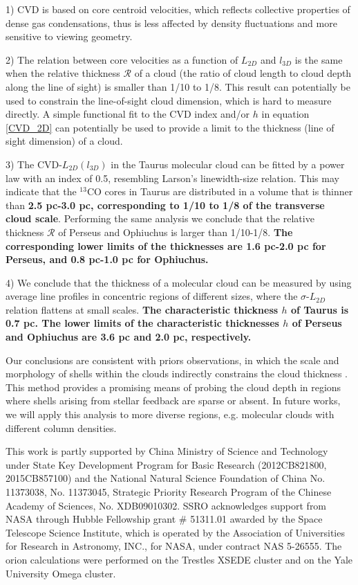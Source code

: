 \documentclass[iop,revtex4]{emulateapj}
\begin{document}
1) CVD is based on core centroid velocities, which reflects collective properties of dense gas condensations, thus is less affected by density fluctuations
\cite[c.f.][]{Brunt2004} and more sensitive to viewing geometry.

2) The relation between core velocities as a function of $L_{2D}$ and $l_{3D}$ is the same when the relative thickness $\mathcal{R}$ of a cloud (the ratio of cloud length to cloud depth along the line of sight) is smaller than 1/10 to 1/8. This result can potentially be used to constrain the line-of-sight cloud dimension, which is hard to measure directly. A simple functional fit to the CVD index and/or $h$ in equation \ref{CVD_2D} can potentially be used to provide a limit to the thickness (line of sight dimension) of a cloud.


3) The CVD-$L_{2D}(l_{3D})$ in the Taurus molecular cloud can be fitted by a power law with an index of 0.5, resembling Larson's linewidth-size relation. This may indicate that the $^{13}$CO cores in Taurus are distributed in a volume that is thinner than {\bf 2.5 pc-3.0 pc, corresponding to 1/10 to 1/8 of the transverse cloud scale}. Performing the same analysis we conclude that the relative thickness $\mathcal{R}$ of Perseus and Ophiuchus is larger than 1/10-1/8.
{\bf The corresponding lower limits of the thicknesses are 1.6 pc-2.0 pc for Perseus, and 0.8 pc-1.0 pc for Ophiuchus.}


4) We conclude that the thickness of a molecular cloud can be measured by using average line profiles in concentric regions of different sizes, where the $\sigma$-$L_{2D}$ relation flattens at small scales. {\bf The characteristic thickness $h$ of Taurus is 0.7 pc. The lower limits of the characteristic thicknesses $h$ of Perseus and Ophiuchus are 3.6 pc and 2.0 pc, respectively.}


Our conclusions are consistent with priors observations, in which the scale and morphology of shells within the clouds indirectly constrains the cloud thickness \citep{Arce2011,Li2015}. This method provides a promising means of probing the cloud depth in regions where shells arising from stellar feedback are sparse or absent. In future works, we will apply this analysis to more diverse regions, e.g. molecular clouds with different column densities.

\acknowledgments This work is partly supported by  China Ministry of
Science and Technology under State Key Development Program for Basic
Research (2012CB821800, 2015CB857100) and the National Natural Science Foundation of China No. 11373038, No. 11373045, Strategic Priority Research Program of the Chinese Academy of Sciences, No. XDB09010302. SSRO acknowledges support from NASA through Hubble Fellowship grant \# 51311.01 awarded by the Space Telescope Science Institute, which is operated by the Association of Universities for Research in Astronomy, INC., for
NASA, under contract NAS 5-26555. The {\sc orion} calculations were performed on the Trestles XSEDE cluster and on the Yale University Omega cluster.
\end{document}
